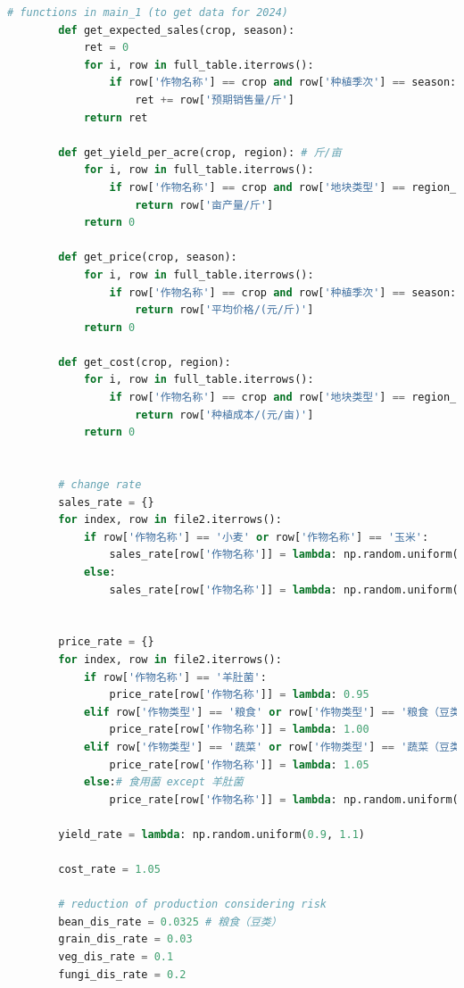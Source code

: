 \documentclass[withoutpreface]{cumcmthesis}
\begin{document}
\begin{appendices}
\begin{lstlisting}[language=python]
        # functions in main_1 (to get data for 2024)
        def get_expected_sales(crop, season):
            ret = 0
            for i, row in full_table.iterrows():
                if row['作物名称'] == crop and row['种植季次'] == season:
                    ret += row['预期销售量/斤']
            return ret
    
        def get_yield_per_acre(crop, region): # 斤/亩
            for i, row in full_table.iterrows():
                if row['作物名称'] == crop and row['地块类型'] == region_to_type[region]:
                    return row['亩产量/斤']
            return 0
        
        def get_price(crop, season):
            for i, row in full_table.iterrows():
                if row['作物名称'] == crop and row['种植季次'] == season:
                    return row['平均价格/(元/斤)']
            return 0
    
        def get_cost(crop, region):
            for i, row in full_table.iterrows():
                if row['作物名称'] == crop and row['地块类型'] == region_to_type[region]:
                    return row['种植成本/(元/亩)']
            return 0
        
    
        # change rate
        sales_rate = {}
        for index, row in file2.iterrows():
            if row['作物名称'] == '小麦' or row['作物名称'] == '玉米':
                sales_rate[row['作物名称']] = lambda: np.random.uniform(1.05, 1.10)
            else:
                sales_rate[row['作物名称']] = lambda: np.random.uniform(0.95, 1.05) #! TODO: potential misunderstanding
    
        
        price_rate = {}
        for index, row in file2.iterrows():
            if row['作物名称'] == '羊肚菌':
                price_rate[row['作物名称']] = lambda: 0.95
            elif row['作物类型'] == '粮食' or row['作物类型'] == '粮食（豆类）':
                price_rate[row['作物名称']] = lambda: 1.00
            elif row['作物类型'] == '蔬菜' or row['作物类型'] == '蔬菜（豆类）':
                price_rate[row['作物名称']] = lambda: 1.05
            else:# 食用菌 except 羊肚菌
                price_rate[row['作物名称']] = lambda: np.random.uniform(0.95, 0.99)
        
        yield_rate = lambda: np.random.uniform(0.9, 1.1)
    
        cost_rate = 1.05
    
        # reduction of production considering risk
        bean_dis_rate = 0.0325 # 粮食（豆类）
        grain_dis_rate = 0.03
        veg_dis_rate = 0.1
        fungi_dis_rate = 0.2
    

\end{lstlisting}
\end{appendices}
\end{document}
